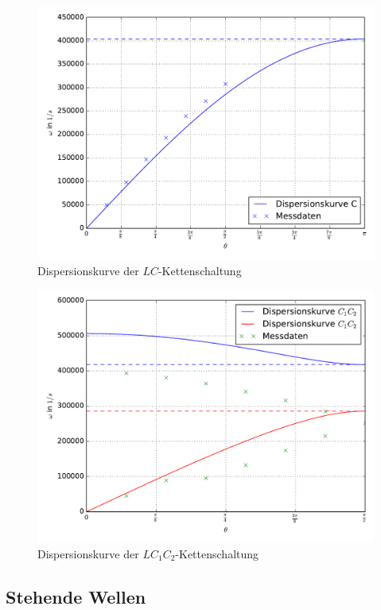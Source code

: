 \begin{figure}
  \includegraphics[width=\textwidth]{Dispersionskurve_C.pdf}
  \caption{Dispersionskurve der $LC$-Kettenschaltung}
  \label{fig:Dispersion_C}
\end{figure}
\begin{figure}
  \includegraphics[width=\textwidth]{Dispersionskurve_C1C2.pdf}
  \caption{Dispersionskurve der $LC_1C_2$-Kettenschaltung}
  \label{fig:Dispersion_C1C2}
\end{figure}

\subsection{Stehende Wellen}

